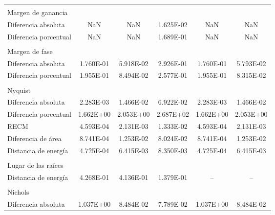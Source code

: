 {\begin{longtable}{l @{\extracolsep{\fill}} ccccc}
            & & & & & \\
            Margen de ganancia     &  &  &  &  & \\ \cmidrule{1-1}
            Diferencia absoluta    &        NaN      &       NaN       & \num{1.625E-02} &       NaN       &        NaN       \\
            Diferencia porcentual  &        NaN      &       NaN       & \num{1.689E-01} &       NaN       &        NaN       \\
            & & & & & \\
            Margen de fase         &  &  &  &  & \\ \cmidrule{1-1}
            Diferencia absoluta    & \num{1.760E-01} & \num{5.918E-02} & \num{2.926E-01} & \num{1.760E-01} & \num{5.793E-02}  \\
            Diferencia porcentual  & \num{1.955E-01} & \num{8.494E-02} & \num{2.577E-01} & \num{1.955E-01} & \num{8.315E-02}  \\
            & & & & & \\
            Nyquist                &  &  &  &  & \\ \cmidrule{1-1}
            Diferencia absoluta    & \num{2.283E-03} & \num{1.466E-02} & \num{6.922E-02} & \num{2.283E-03} & \num{1.466E-02}  \\
            Diferencia porcentual  & \num{1.662E+00} & \num{2.053E+00} & \num{2.687E+02} & \num{1.662E+00} & \num{2.053E+00}  \\
            RECM                   & \num{4.593E-04} & \num{2.131E-03} & \num{1.333E-02} & \num{4.593E-04} & \num{2.131E-03}  \\
            Diferencia de área     & \num{8.741E-04} & \num{1.253E-02} & \num{8.024E-02} & \num{8.741E-04} & \num{1.253E-02}  \\
            Distancia de energía   & \num{4.725E-04} & \num{6.415E-03} & \num{8.350E-03} & \num{4.725E-04} & \num{6.415E-03}  \\
            & & & & & \\
            Lugar de las raíces    &  &  &  &  & \\ \cmidrule{1-1}
            Distancia de energía   & \num{4.268E-01} & \num{4.136E-01} & \num{1.379E-01} & -- & --  \\
            & & & & & \\
            Nichols                &  &  &  &  & \\ \cmidrule{1-1}
            Diferencia absoluta    & \num{1.037E+00} & \num{8.484E-02} & \num{7.789E-02} & \num{1.037E+00} & \num{8.484E-02}  \\

\end{longtable}}
